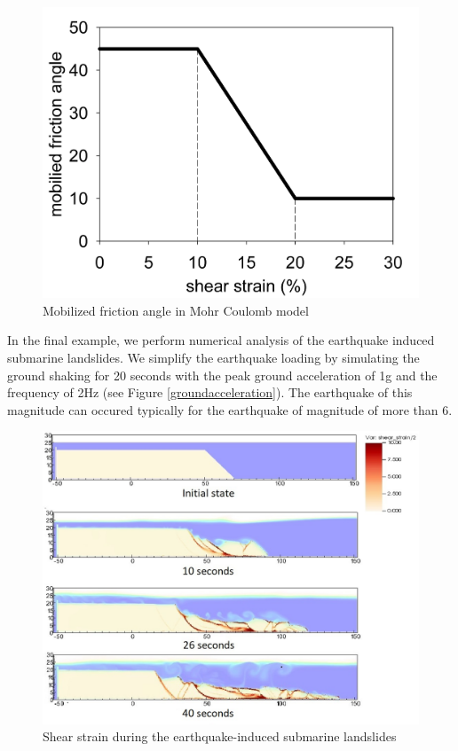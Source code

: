 \documentclass[preprint,12pt]{elsarticle}
\begin{document}
%
%
\begin{figure}[h]
\center
\includegraphics[scale=0.25]{model.jpg}
\caption{Mobilized friction angle in Mohr Coulomb model}
\label{fig:model}
\end{figure}
%
%
In the final example, we perform numerical analysis of the earthquake induced submarine landslides. We simplify the earthquake loading by simulating the ground shaking for 20 seconds with the peak ground acceleration of 1g and the frequency of 2Hz (see Figure \ref{groundacceleration}). The earthquake of this magnitude can occured typically for the earthquake of magnitude of more than 6. 
%
\begin{figure}[h]
\center
\includegraphics[scale=0.5]{landslide_gamma.jpeg}
\caption{Shear strain during the earthquake-induced submarine landslides}
\label{fig:gamma}
\end{figure}
%
%
\end{document}
